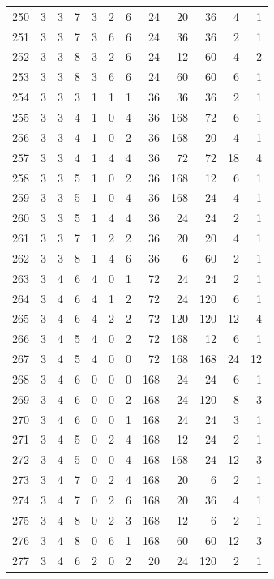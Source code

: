 \documentclass[11pt,a4paper]{article}
\begin{document}
\begin{longtable}{r|rrr|rrr|rrr|rr}
250 & 3 & 3 & 7 & 3 & 2 & 6 & 24 & 20 & 36 & 4 & 1\\
251 & 3 & 3 & 7 & 3 & 6 & 6 & 24 & 36 & 36 & 2 & 1\\
252 & 3 & 3 & 8 & 3 & 2 & 6 & 24 & 12 & 60 & 4 & 2\\
253 & 3 & 3 & 8 & 3 & 6 & 6 & 24 & 60 & 60 & 6 & 1\\
254 & 3 & 3 & 3 & 1 & 1 & 1 & 36 & 36 & 36 & 2 & 1\\
255 & 3 & 3 & 4 & 1 & 0 & 4 & 36 & 168 & 72 & 6 & 1\\
256 & 3 & 3 & 4 & 1 & 0 & 2 & 36 & 168 & 20 & 4 & 1\\
257 & 3 & 3 & 4 & 1 & 4 & 4 & 36 & 72 & 72 & 18 & 4\\
258 & 3 & 3 & 5 & 1 & 0 & 2 & 36 & 168 & 12 & 6 & 1\\
259 & 3 & 3 & 5 & 1 & 0 & 4 & 36 & 168 & 24 & 4 & 1\\
260 & 3 & 3 & 5 & 1 & 4 & 4 & 36 & 24 & 24 & 2 & 1\\
261 & 3 & 3 & 7 & 1 & 2 & 2 & 36 & 20 & 20 & 4 & 1\\
262 & 3 & 3 & 8 & 1 & 4 & 6 & 36 & 6 & 60 & 2 & 1\\
263 & 3 & 4 & 6 & 4 & 0 & 1 & 72 & 24 & 24 & 2 & 1\\
264 & 3 & 4 & 6 & 4 & 1 & 2 & 72 & 24 & 120 & 6 & 1\\
265 & 3 & 4 & 6 & 4 & 2 & 2 & 72 & 120 & 120 & 12 & 4\\
266 & 3 & 4 & 5 & 4 & 0 & 2 & 72 & 168 & 12 & 6 & 1\\
267 & 3 & 4 & 5 & 4 & 0 & 0 & 72 & 168 & 168 & 24 & 12\\
268 & 3 & 4 & 6 & 0 & 0 & 0 & 168 & 24 & 24 & 6 & 1\\
269 & 3 & 4 & 6 & 0 & 0 & 2 & 168 & 24 & 120 & 8 & 3\\
270 & 3 & 4 & 6 & 0 & 0 & 1 & 168 & 24 & 24 & 3 & 1\\
271 & 3 & 4 & 5 & 0 & 2 & 4 & 168 & 12 & 24 & 2 & 1\\
272 & 3 & 4 & 5 & 0 & 0 & 4 & 168 & 168 & 24 & 12 & 3\\
273 & 3 & 4 & 7 & 0 & 2 & 4 & 168 & 20 & 6 & 2 & 1\\
274 & 3 & 4 & 7 & 0 & 2 & 6 & 168 & 20 & 36 & 4 & 1\\
275 & 3 & 4 & 8 & 0 & 2 & 3 & 168 & 12 & 6 & 2 & 1\\
276 & 3 & 4 & 8 & 0 & 6 & 1 & 168 & 60 & 60 & 12 & 3\\
277 & 3 & 4 & 6 & 2 & 0 & 2 & 20 & 24 & 120 & 2 & 1\\

\end{longtable}
\end{document}
